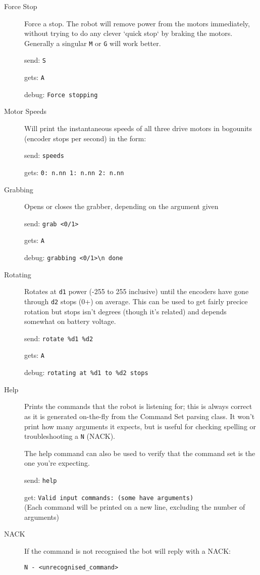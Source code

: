 \begin{description}
  
\item[Force Stop]
  Force a stop. The robot will remove power from the motors immediately, without trying to do any clever `quick stop` by braking the motors. Generally a singular \verb|M| or \verb|G| will work better.
  
  send: \verb|S|

  gets: \verb|A|

  debug: \verb|Force stopping|

  
\item[Motor Speeds]
  Will print the instantaneous speeds of all three drive motors in bogounits (encoder stops per second) in the form:

  send: \verb|speeds|
  
  gets: \verb|0: n.nn 1: n.nn 2: n.nn|


\item[Grabbing]
  Opens or closes the grabber, depending on the argument given

  send: \verb|grab <0/1>|

  gets: \verb|A|

  debug: \verb|grabbing <0/1>\n done|


\item[Rotating]
  Rotates at \texttt{d1} power (-255 to 255 inclusive) until the encoders have gone through \texttt{d2} stops (0+) on average. This can be used to get fairly precice rotation but stops isn't degrees (though it's related) and depends somewhat on battery voltage.

  send: \verb|rotate %d1 %d2|

  gets: \verb|A|

  debug: \verb|rotating at %d1 to %d2 stops|


\item[Help]
  Prints the commands that the robot is listening for; this is always correct as it is generated on-the-fly from the Command Set parsing class. It won't print how many arguments it expects, but is useful for checking spelling or troubleshooting a \texttt{N} (NACK).

  The help command can also be used to verify that the command set is the one you're expecting.

  send: \verb|help|

  get: \verb|Valid input commands: (some have arguments)|\\
  (Each command will be printed on a new line, excluding the number of arguments)


\item[NACK]
  If the command is not recognised the bot will reply with a NACK:

  \verb|N - <unrecognised_command>|

\end{description}
